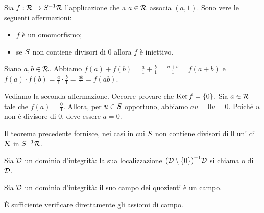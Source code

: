 \begin{Theorem}
	Sia $f: \mathcal{R} \rightarrow {S}^{-1}\mathcal{R}$ l'applicazione che a $a \in \mathcal{R}$ associa $(a,1)$. Sono vere le seguenti affermazioni:
	\begin{itemize}
		\item $f$ \`e un omomorfismo;
		\item se $S$ non contiene divisori di $0$ allora $f$ \`e iniettivo.
	\end{itemize}
\end{Theorem}
\Proof Siano $a, b \in \mathcal{R}$. Abbiamo $f(a) + f(b) = \frac{a}{1} + \frac{b}{1} = \frac{a + b}{1} = f(a + b)$ e $f(a) \cdot f(b) = \frac{a}{1} \cdot \frac{b}{1} = \frac{ab}{1} = f(ab)$.
\par Vediamo la seconda affermazione. Occorre provare che $\operatorname{Ker}{f} = \lbrace 0 \rbrace$. Sia $a \in \mathcal{R}$ tale che $f(a) = \frac{0}{1}$. Allora, per $u \in S$ opportuno, abbiamo $au = 0u = 0$. Poich\'e $u$ non \`e divisore di $0$, deve essere $a = 0$. \EndProof
\par Il teorema precedente fornisce, nei casi in cui $S$ non contiene divisori di $0$ un' di $\mathcal{R}$ in ${S}^{-1}\mathcal{R}$.
\begin{Definition}
	Sia $\mathcal{D}$ un dominio d'integrit\`a: la sua localizzazione ${(\mathcal{D} \setminus \lbrace 0 \rbrace)}^{-1}\mathcal{D}$ si chiama  o  di $\mathcal{D}$.
\end{Definition}
\begin{Theorem}
	Sia $\mathcal{D}$ un dominio d'integrit\`a: il suo campo dei quozienti \`e un campo.
\end{Theorem}
\Proof \`E sufficiente verificare direttamente gli assiomi di campo. \EndProof
